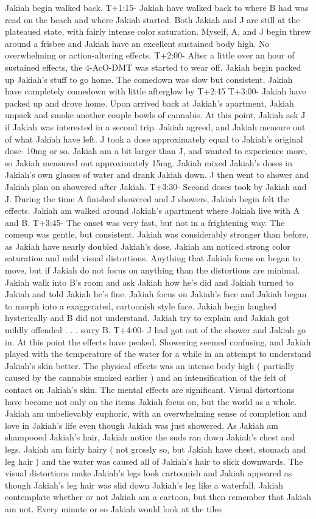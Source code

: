 \documentclass[12pt]{book}
\begin{document}
Jakiah begin walked back. T+1:15- Jakiah have walked back to where B had was read on the beach and where Jakiah started. Both Jakiah and J are still at the plateaued state, with fairly intense color saturation. Myself, A, and J begin threw around a frisbee and Jakiah have an excellent sustained body high. No overwhelming or action-altering effects. T+2:00- After a little over an hour of sustained effects, the 4-AcO-DMT was started to wear off. Jakiah begin packed up Jakiah's stuff to go home. The comedown was slow but consistent. Jakiah have completely comedown with little afterglow by T+2:45 T+3:00- Jakiah have packed up and drove home. Upon arrived back at Jakiah's apartment, Jakiah unpack and smoke another couple bowls of cannabis. At this point, Jakiah ask J if Jakiah was interested in a second trip. Jakiah agreed, and Jakiah measure out of what Jakiah have left. J took a dose approximately equal to Jakiah's original dose- 10mg or so. Jakiah am a bit larger than J, and wanted to experience more, so Jakiah measured out approximately 15mg. Jakiah mixed Jakiah's doses in Jakiah's own glasses of water and drank Jakiah down. J then went to shower and Jakiah plan on showered after Jakiah. T+3:30- Second doses took by Jakiah and J. During the time A finished showered and J showers, Jakiah begin felt the effects. Jakiah am walked around Jakiah's apartment where Jakiah live with A and B. T+3:45- The onset was very fast, but not in a frightening way. The comeup was gentle, but consistent. Jakiah was considerably stronger than before, as Jakiah have nearly doubled Jakiah's dose. Jakiah am noticed strong color saturation and mild visual distortions. Anything that Jakiah focus on began to move, but if Jakiah do not focus on anything than the distortions are minimal. Jakiah walk into B's room and ask Jakiah how he's did and Jakiah turned to Jakiah and told Jakiah he's fine. Jakiah focus on Jakiah's face and Jakiah began to morph into a exaggerated, cartoonish style face. Jakiah begin laughed hysterically and B did not understand. Jakiah try to explain and Jakiah got mildly offended . . .  sorry B. T+4:00- J had got out of the shower and Jakiah go in. At this point the effects have peaked. Showering seemed confusing, and Jakiah played with the temperature of the water for a while in an attempt to understand Jakiah's skin better. The physical effects was an intense body high ( partially caused by the cannabis smoked earlier ) and an intensification of the felt of contact on Jakiah's skin. The mental effects are significant. Visual distortions have become not only on the items Jakiah focus on, but the world as a whole. Jakiah am unbelievably euphoric, with an overwhelming sense of completion and love in Jakiah's life even though Jakiah was just showered. As Jakiah am shampooed Jakiah's hair, Jakiah notice the suds ran down Jakiah's chest and legs. Jakiah am fairly hairy ( not grossly so, but Jakiah have chest, stomach and leg hair ) and the water was caused all of Jakiah's hair to slick downwards. The visual distortions make Jakiah's legs look cartoonish and Jakiah appeared as though Jakiah's leg hair was slid down Jakiah's leg like a waterfall. Jakiah contemplate whether or not Jakiah am a cartoon, but then remember that Jakiah am not. Every minute or so Jakiah would look at the tiles 
\end{document}
